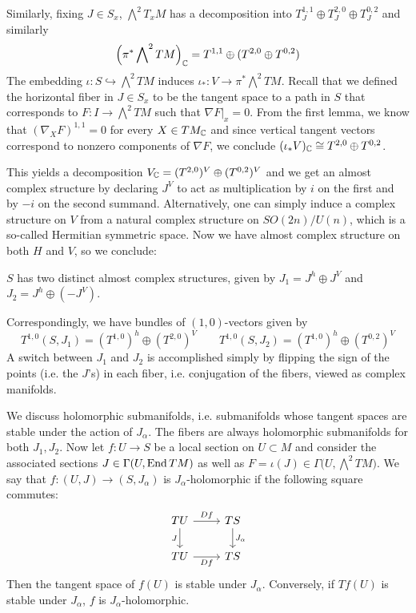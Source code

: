 \documentclass{scrartcl}
\begin{document}
\medskip

Similarly, fixing $J\in S_x$, $\bigwedge^2 T_xM$ has a decomposition into $T_J^{1,1}\oplus T_J^{2,0}\oplus T_J^{0,2}$ and similarly 
\begin{equation*}
	\Big(\pi^*\bigwedge\nolimits^2 TM\Big)_{\mathbb{C}}=T^{1,1}\oplus (T^{2,0}\oplus T^{0,2})
\end{equation*}
The embedding $\iota: S\hookrightarrow \bigwedge^2 TM$ induces  $\iota_*:V\to \pi^*\bigwedge^2 TM$. Recall that we defined the horizontal fiber in $J\in S_x$ to be the tangent space to a path in $S$ that corresponds to $F:I\to \bigwedge^2 TM$ such that $\nabla F|_x=0$. From the first lemma, we know that $(\nabla_X F)^{1,1}=0$ for every $X\in TM_{\mathbb{C}}$ and since vertical tangent vectors correspond to nonzero components of $\nabla F$, we conclude $(\iota_*V)_{\mathbb{C}}\cong T^{2,0}\oplus T^{0,2}$.

\medskip

This yields a decomposition $V_{\mathbb{C}}=(T^{2,0})^V\oplus (T^{0,2})^V$ and we get an almost complex structure by declaring $J^V$ to act as multiplication by $i$ on the first and by $-i$ on the second summand. Alternatively, one can simply induce a complex structure on $V$ from a natural complex structure on $SO(2n)/U(n)$, which is a so-called Hermitian symmetric space. Now we have almost complex structure on both $H$ and $V$, so we conclude:

\begin{prop}
	$S$ has two distinct almost complex structures, given by $J_1=J^h\oplus J^V$ and $J_2=J^h\oplus (-J^V)$.
\end{prop}

Correspondingly, we have bundles of $(1,0)$-vectors given by
\begin{equation*}
	T^{1,0}(S,J_1)=(T^{1,0})^h\oplus (T^{2,0})^V\qquad 
	T^{1,0}(S,J_2)=(T^{1,0})^h\oplus (T^{0,2})^V
\end{equation*}
A switch between $J_1$ and $J_2$ is accomplished simply by flipping the sign of the points (i.e. the $J$'s) in each fiber, i.e. conjugation of the fibers, viewed as complex manifolds.

\medskip

We discuss holomorphic submanifolds, i.e. submanifolds whose tangent spaces are stable under the action of $J_\alpha$. The fibers are always holomorphic submanifolds for both $J_1,J_2$. Now let $f:U\to S$ be a local section on $U\subset M$ and consider the associated sections $J\in \Gamma(U,\operatorname{End} TM)$ as well as $F=\iota (J)\in \Gamma\big(U,\bigwedge^2 TM\big)$. We say that $f:(U,J)\to (S,J_\alpha)$ is $J_\alpha$-holomorphic if the following square commutes:
\begin{equation*}
	\begin{tikzcd}
		TU \ar[r,"\dif f"] \ar[d,"J"'] & TS \ar[d,"J_\alpha"] \\
		TU \ar[r,"\dif f"'] & TS
	\end{tikzcd}
\end{equation*} 
Then the tangent space of $f(U)$ is stable under $J_\alpha$. Conversely, if $Tf(U)$ is stable under $J_\alpha$, $f$ is $J_\alpha$-holomorphic.
\end{document}
